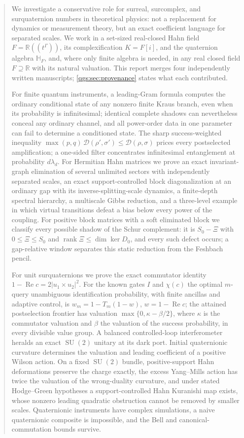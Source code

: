 \documentclass[11pt,oneside]{article}
\numberwithin{equation}{section}
\theoremstyle{plain}
\theoremstyle{definition}
\theoremstyle{remark}
\newcommand{\R}{\mathbb R}
\newcommand{\HF}{\mathbb H_F}
\newcommand{\TD}{\mathcal D}
\DeclareMathOperator{\Rea}{Re}
\DeclareMathOperator{\rank}{rank}
\DeclareMathOperator{\SU}{SU}
\newcommand{\abs}[1]{\left|#1\right|}
\begin{document}
\begin{abstract}
We investigate a conservative role for surreal, surcomplex, and surquaternion numbers in theoretical physics: not a replacement for dynamics or measurement theory, but an exact coefficient language for separated scales. We work in a set-sized real-closed Hahn field $F=\R((t^\Gamma))$, its complexification $K=F[i]$, and the quaternion algebra $\HF$, and, where only finite algebra is needed, in any real closed field $F\supseteq\R$ with its natural valuation. This report merges four independently written manuscripts; \cref{qgs:sec:provenance} states what each contributed.

For finite quantum instruments, a leading-Gram formula computes the ordinary conditional state of any nonzero finite Kraus branch, even when its probability is infinitesimal; identical complete shadows can nevertheless conceal any ordinary channel, and all power-order data in one parameter can fail to determine a conditioned state. The sharp success-weighted inequality $\max(p,q)\,\TD(\rho',\sigma')\le\TD(\rho,\sigma)$ prices every postselected amplification; a one-sided filter concentrates infinitesimal entanglement at probability $d\lambda_d$. For Hermitian Hahn matrices we prove an exact invariant-graph elimination of several unlimited sectors with independently separated scales, an exact support-controlled block diagonalization at an ordinary gap with its inverse-splitting-scale dynamics, a finite-depth spectral hierarchy, a multiscale Gibbs reduction, and a three-level example in which virtual transitions defeat a bias below every power of the coupling. For positive block matrices with a soft eliminated block we classify every possible shadow of the Schur complement: it is $S_0-\Xi$ with $0\le\Xi\le S_0$ and $\rank\Xi\le\dim\ker D_0$, and every such defect occurs; a gap-relative window separates this static reduction from the Feshbach pencil.

For unit surquaternions we prove the exact commutator identity $1-\Rea c=2\abs{u_1\times u_2}^2$. For the known gates $I$ and $\chi(c)$ the optimal $m$-query unambiguous identification probability, with finite ancillas and adaptive control, is $w_m=1-T_m(1-w)$, $w=1-\Rea c$; the attained postselection frontier has valuation $\max\{0,\kappa-\beta/2\}$, where $\kappa$ is the commutator valuation and $\beta$ the valuation of the success probability, in every divisible value group. A balanced controlled-loop interferometer heralds an exact $\SU(2)$ unitary at its dark port. Initial quaternionic curvature determines the valuation and leading coefficient of a positive Wilson action. On a fixed $\SU(2)$ bundle, positive-support Hahn deformations preserve the charge exactly, the excess Yang--Mills action has twice the valuation of the wrong-duality curvature, and under stated Hodge--Green hypotheses a support-controlled Hahn Kuranishi map exists, whose nonzero leading quadratic obstruction cannot be removed by smaller scales. Quaternionic instruments have complex simulations, a naive quaternionic composite is impossible, and the Bell and canonical-commutation bounds survive.


\end{abstract}
\end{document}
